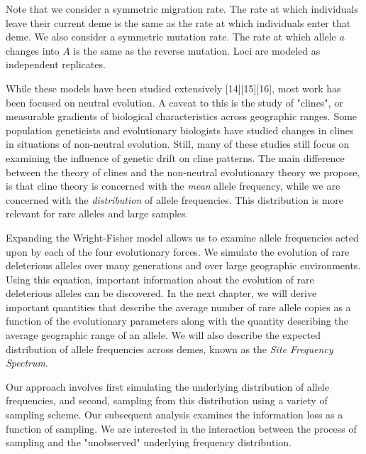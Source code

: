 Note that we consider a symmetric migration rate. The rate at which individuals leave their current deme is the same as the rate at which individuals enter that deme. We also consider a symmetric mutation rate. The rate at which allele $a$ changes into $A$ is the same as the reverse mutation. Loci are modeled as independent replicates.

While these models have been studied extensively [14][15][16], most work has been focused on neutral evolution. A caveat to this is the study of "clines", or measurable gradients of biological characteristics across geographic ranges. Some population geneticists and evolutionary biologists have studied changes in clines in situations of non-neutral evolution. \cite{baines_2004} Still, many of these studies still focus on examining the influence of genetic drift on cline patterns. \cite{polechova_barton_2011} The main difference between the theory of clines and the non-neutral evolutionary theory we propose, is that cline theory is concerned with the \textit{mean} allele frequency, while we are concerned with the \textit{distribution} of allele frequencies.\cite{vasemagi_2006} This distribution is more relevant for rare alleles and large samples. 


Expanding the Wright-Fisher model allows us to examine allele frequencies acted upon by each of the four evolutionary forces. We simulate the evolution of rare deleterious alleles over many generations and over large geographic environments. Using this equation, important information about the evolution of rare deleterious alleles can be discovered. In the next chapter, we will derive important quantities that describe the average number of rare allele copies as a function of the evolutionary parameters along with the quantity describing the average geographic range of an allele. We will also describe the expected distribution of allele frequencies across demes, known as the \textit{Site Frequency Spectrum}.


Our approach involves first simulating the underlying distribution of allele frequencies, and second, sampling from this distribution using a variety of sampling scheme. Our subsequent analysis examines the information loss as a function of sampling. We are interested in the interaction between the process of sampling and the "unobserved" underlying frequency distribution. 


